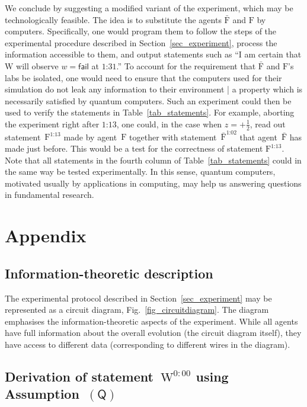 \documentclass[12pt]{article}
\theoremstyle{mystyle}
\theoremstyle{definition}
\newcommand*{\Friendone}{\mathrm{\bar{F}}}
\newcommand*{\Friendtwo}{\mathrm{F}}
\newcommand*{\Wigner}{\mathrm{W}}
\newcommand*{\splus}{{\textstyle + \frac{1}{2}}}
\newcommand*{\QT}{\mathsf{(Q)}}
\newcommand*{\fail}{\mathsf{fail}}
\begin{document}
We conclude by suggesting a modified variant of the experiment, which may be technologically feasible. The idea is to substitute the agents $\Friendone$ and $\Friendtwo$ by computers. Specifically, one would program them to follow the steps of the experimental procedure described in Section~\ref{sec_experiment},  process the information accessible to them, and output statements such as {``I am certain that $\Wigner$ will observe $w = \fail$ at $\text{1:31}$.''} To account for the requirement that $\Friendone$ and $\Friendtwo$'s labs be isolated, one would need to ensure that the computers used for their simulation do not leak any information to their environment | a property which is necessarily satisfied by quantum computers. Such an experiment could then be used to verify the statements in Table~\ref{tab_statements}. For example, aborting the experiment right after $\text{$1$:13}$, one could, in the case when $z=\splus$, read out  statement~$\Friendtwo^{\text{$1$:13}}$ made by agent~$\Friendtwo$ together with  statement~$\Friendone^{\text{$1$:02}}$ that agent~$\Friendone$ has made just before. This would be a test for the correctness of statement $\Friendtwo^{\text{$1$:13}}$. Note that all statements in the fourth column of Table~\ref{tab_statements} could in the same way be tested experimentally.  In this sense, quantum computers, motivated usually by applications in computing, may help us answering questions in fundamental research.  

\appendix

\section*{Appendix}

\setcounter{section}{1}

\subsection{Information-theoretic description} \label{app_diagram}

The experimental protocol described in Section~\ref{sec_experiment} may be represented as a circuit diagram, Fig.~\ref{fig_circuitdiagram}. The diagram emphasises the information-theoretic aspects of the experiment. While all agents have full information about the overall evolution (the circuit diagram itself), they have access to different data (corresponding to different wires in the diagram).

 
\subsection{Derivation of statement~$\Wigner^{\mathrm{0:00}}$ using Assumption~$\QT$} \label{app_statementW}
\end{document}
